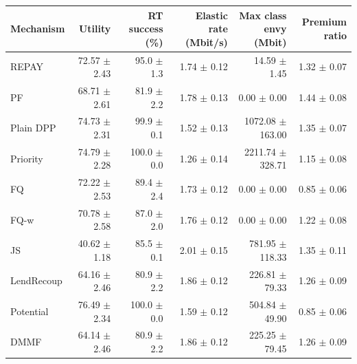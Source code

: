 \begin{tabular}{lrrrrr}
\toprule
Mechanism & Utility & RT success (\%) & Elastic rate (Mbit/s) & Max class envy (Mbit) & Premium ratio \\
\midrule
REPAY & 72.57 $\pm$ 2.43 & 95.0 $\pm$ 1.3 & 1.74 $\pm$ 0.12 & 14.59 $\pm$ 1.45 & 1.32 $\pm$ 0.07 \\
PF & 68.71 $\pm$ 2.61 & 81.9 $\pm$ 2.2 & 1.78 $\pm$ 0.13 & 0.00 $\pm$ 0.00 & 1.44 $\pm$ 0.08 \\
Plain DPP & 74.73 $\pm$ 2.31 & 99.9 $\pm$ 0.1 & 1.52 $\pm$ 0.13 & 1072.08 $\pm$ 163.00 & 1.35 $\pm$ 0.07 \\
Priority & 74.79 $\pm$ 2.28 & 100.0 $\pm$ 0.0 & 1.26 $\pm$ 0.14 & 2211.74 $\pm$ 328.71 & 1.15 $\pm$ 0.08 \\
\midrule
FQ & 72.22 $\pm$ 2.53 & 89.4 $\pm$ 2.4 & 1.73 $\pm$ 0.12 & 0.00 $\pm$ 0.00 & 0.85 $\pm$ 0.06 \\
FQ-w & 70.78 $\pm$ 2.58 & 87.0 $\pm$ 2.0 & 1.76 $\pm$ 0.12 & 0.00 $\pm$ 0.00 & 1.22 $\pm$ 0.08 \\
JS & 40.62 $\pm$ 1.18 & 85.5 $\pm$ 0.1 & 2.01 $\pm$ 0.15 & 781.95 $\pm$ 118.33 & 1.35 $\pm$ 0.11 \\
LendRecoup & 64.16 $\pm$ 2.46 & 80.9 $\pm$ 2.2 & 1.86 $\pm$ 0.12 & 226.81 $\pm$ 79.33 & 1.26 $\pm$ 0.09 \\
Potential & 76.49 $\pm$ 2.34 & 100.0 $\pm$ 0.0 & 1.59 $\pm$ 0.12 & 504.84 $\pm$ 49.90 & 0.85 $\pm$ 0.06 \\
DMMF & 64.14 $\pm$ 2.46 & 80.9 $\pm$ 2.2 & 1.86 $\pm$ 0.12 & 225.25 $\pm$ 79.45 & 1.26 $\pm$ 0.09 \\
\bottomrule
\end{tabular}
